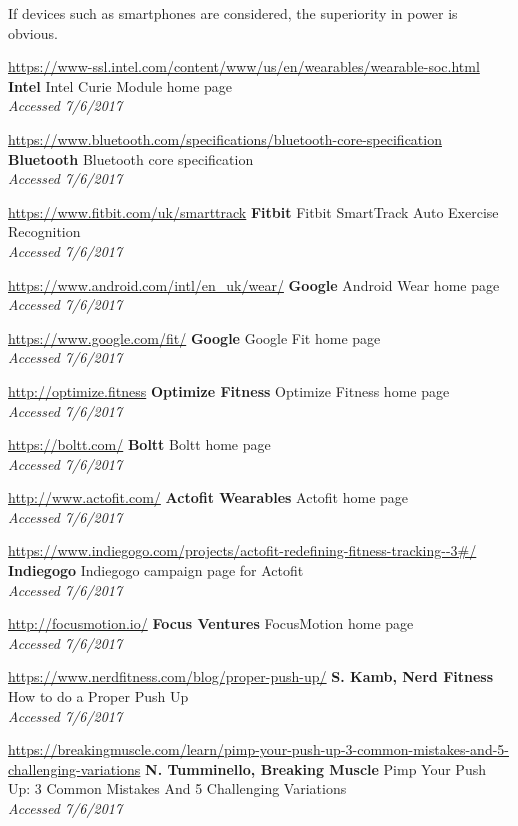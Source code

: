 \documentclass[a4paper]{article}
\begin{document}
\begin{thebibliography}{9}
If devices such as smartphones are considered, the superiority in power is obvious.

\url{https://www-ssl.intel.com/content/www/us/en/wearables/wearable-soc.html}
\textbf{Intel}
Intel Curie Module home page
\\\textit{Accessed 7/6/2017}

\url{https://www.bluetooth.com/specifications/bluetooth-core-specification}
\textbf{Bluetooth}
Bluetooth core specification
\\\textit{Accessed 7/6/2017}

\url{https://www.fitbit.com/uk/smarttrack}
\textbf{Fitbit}
Fitbit SmartTrack Auto Exercise Recognition
\\\textit{Accessed 7/6/2017}

\url{https://www.android.com/intl/en_uk/wear/}
\textbf{Google}
Android Wear home page
\\\textit{Accessed 7/6/2017}

\url{https://www.google.com/fit/}
\textbf{Google}
Google Fit home page
\\\textit{Accessed 7/6/2017}

\url{http://optimize.fitness}
\textbf{Optimize Fitness}
Optimize Fitness home page
\\\textit{Accessed 7/6/2017}

\url{https://boltt.com/}
\textbf{Boltt}
Boltt home page
\\\textit{Accessed 7/6/2017}

\url{http://www.actofit.com/}
\textbf{Actofit Wearables}
Actofit home page
\\\textit{Accessed 7/6/2017}

\url{https://www.indiegogo.com/projects/actofit-redefining-fitness-tracking--3#/}
\textbf{Indiegogo}
Indiegogo campaign page for Actofit
\\\textit{Accessed 7/6/2017}

\url{http://focusmotion.io/}
\textbf{Focus Ventures}
FocusMotion home page
\\\textit{Accessed 7/6/2017}

\url{https://www.nerdfitness.com/blog/proper-push-up/}
\textbf{S. Kamb, Nerd Fitness}
How to do a Proper Push Up
\\\textit{Accessed 7/6/2017}

\url{https://breakingmuscle.com/learn/pimp-your-push-up-3-common-mistakes-and-5-challenging-variations}
\textbf{N. Tumminello, Breaking Muscle}
Pimp Your Push Up: 3 Common Mistakes And 5 Challenging Variations
\\\textit{Accessed 7/6/2017}


\end{thebibliography}
\end{document}
